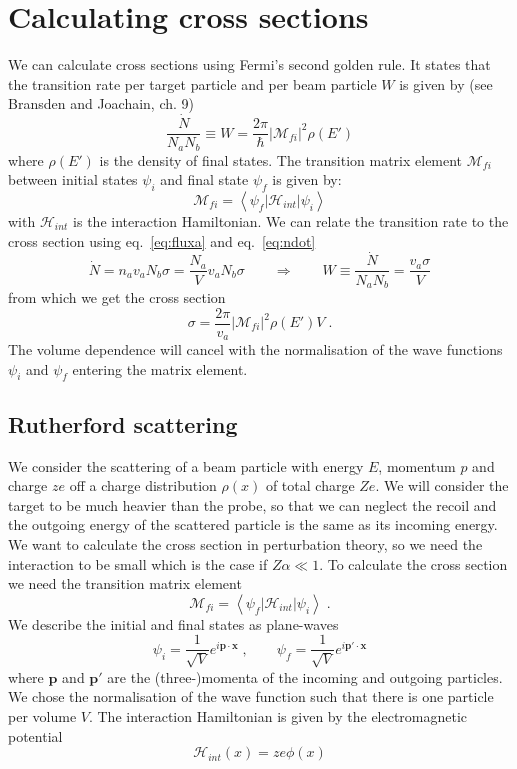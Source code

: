 \documentclass[12pt]{article}
\newcommand{\V}[1]{\mathbf{#1}}
\begin{document}
\section{Calculating cross sections}
We can calculate cross sections using Fermi's second golden rule. It states that the transition rate per target particle and per beam particle $W$ is given by (see Bransden and Joachain, ch. 9)
\[\frac{\dot N}{N_a N_b}\equiv W=\frac{2\pi}{\hbar}\left|\mathcal{M}_{fi}\right|^2\rho(E')\]
where $\rho(E')$ is the density of final states. The transition matrix element $\mathcal{M}_{fi}$ between initial states $\psi_i$ and final state $\psi_f$ is given by:
\[\mathcal{M}_{fi}=\left<\psi_f|\mathcal{H}_{int}|\psi_i\right>\]
with $\mathcal{H}_{int}$ is the interaction Hamiltonian.
We can relate the transition rate to the cross section using eq.~\ref{eq:fluxa} and eq.~\ref{eq:ndot}
\[\dot N = n_a v_a N_b \sigma =\frac{N_a}{V} v_a N_b \sigma
\qquad
\Rightarrow
\qquad
W\equiv \frac{\dot N}{N_a N_b}=\frac{v_a\sigma}{V}
 \]
from which we get the cross section
\begin{equation}\label{eq:xsection}
\sigma=\frac{2\pi}{v_a}\left|\mathcal{M}_{fi}\right|^2\rho(E') V\;.\end{equation}
The volume dependence will cancel with the normalisation of the wave functions $\psi_i$ and $\psi_f$ entering the matrix element.
%
%
\subsection{Rutherford scattering}
%
%
%
We consider the scattering of a beam particle with energy $E$, momentum $p$ and  charge $ze$ off a charge distribution $\rho(x)$ of total charge $Ze$. We will consider the target to be much heavier than the probe, so that we can neglect the recoil and the outgoing energy of the scattered particle is the same as its incoming energy. We want to calculate the cross section in perturbation theory, so we need the interaction to be small which is the case if $Z\alpha\ll 1$. 
To calculate the cross section we need the transition matrix element
\[\mathcal{M}_{fi}=\left<\psi_f|\mathcal{H}_{int}|\psi_i\right>\;.\]
We describe the initial and final states as plane-waves
\[\psi_i=\frac{1}{\sqrt{V}}e^{i\V{p}\cdot\V{x}}\;,\qquad \psi_f=\frac{1}{\sqrt{V}}e^{i\V{p'}\cdot\V{x}}\]
where $\V{p}$ and $\V{p'}$ are the (three-)momenta of the incoming and outgoing particles. We chose the normalisation of the wave function such that there is one particle per volume $V$. The interaction Hamiltonian is given by the electromagnetic potential
\[\mathcal{H}_{int}(x)=ze\phi(x)\]
\end{document}
